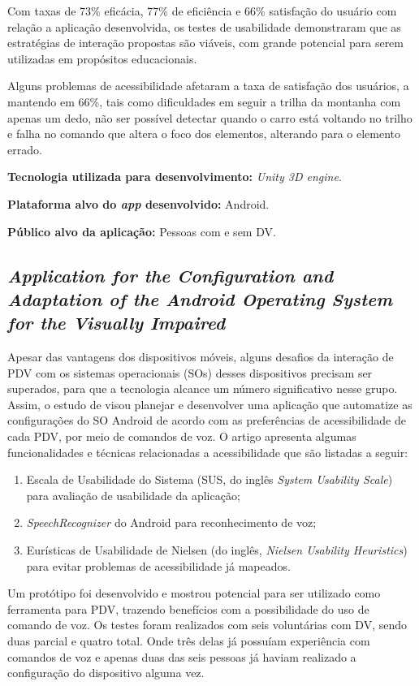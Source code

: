 Com taxas de 73\% eficácia, 77\% de eficiência e 66\% satisfação do usuário com relação a aplicação desenvolvida, os testes de usabilidade demonstraram que as estratégias de interação propostas são viáveis, com grande potencial para serem utilizadas em propósitos educacionais.

Alguns problemas de acessibilidade afetaram a taxa de satisfação dos usuários, a mantendo em 66\%, tais como dificuldades em seguir a trilha da montanha com apenas um dedo, não ser possível detectar quando o carro está voltando no trilho e falha no comando que altera o foco dos elementos, alterando para o elemento errado.

\textbf{Tecnologia utilizada para desenvolvimento:} \emph{Unity 3D engine}.

\textbf{Plataforma alvo do \emph{app} desenvolvido:} Android.

\textbf{Público alvo da aplicação:} Pessoas com e sem DV\@.

\subsection{\emph{Application for the Configuration and Adaptation of the Android Operating System for the Visually Impaired}}

Apesar das vantagens dos dispositivos móveis, alguns desafios da interação de PDV com os sistemas operacionais (SOs) desses dispositivos precisam ser superados, para que a tecnologia alcance
um número significativo nesse grupo. Assim, o estudo de  visou planejar e desenvolver uma aplicação que automatize as configurações do SO Android de acordo com
as preferências de acessibilidade de cada PDV, por meio de comandos de voz. O artigo apresenta algumas funcionalidades e técnicas relacionadas a acessibilidade que são listadas a seguir:

\begin{enumerate}
    \item Escala de Usabilidade do Sistema (SUS, do inglês \emph{System Usability Scale}) para avaliação de usabilidade da aplicação;
    \item \emph{SpeechRecognizer} do Android para reconhecimento de voz;
    \item Eurísticas de Usabilidade de Nielsen (do inglês, \emph{Nielsen Usability Heuristics}) para evitar problemas de acessibilidade já mapeados.
\end{enumerate}

Um protótipo foi desenvolvido e mostrou potencial para ser utilizado como ferramenta para PDV, trazendo benefícios com a possibilidade do uso de comando de voz.
Os testes foram realizados com seis voluntárias com DV, sendo duas parcial e quatro total.
Onde três delas já possuíam experiência com comandos de voz e apenas duas das seis pessoas já haviam realizado a configuração do dispositivo alguma vez.

